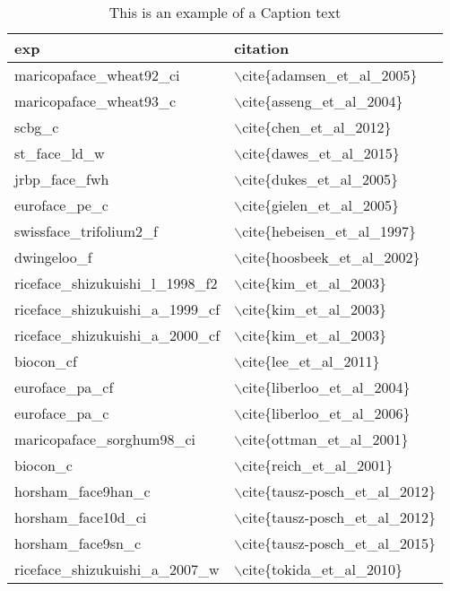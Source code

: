 \begin{table}[ht]
\centering
\begin{tabular}{ll}
  \hline
exp & citation \\ 
  \hline
maricopaface\_wheat92\_ci & $\backslash$cite\{adamsen\_et\_al\_2005\} \\ 
  maricopaface\_wheat93\_c & $\backslash$cite\{asseng\_et\_al\_2004\} \\ 
  scbg\_c & $\backslash$cite\{chen\_et\_al\_2012\} \\ 
  st\_face\_ld\_w & $\backslash$cite\{dawes\_et\_al\_2015\} \\ 
  jrbp\_face\_fwh & $\backslash$cite\{dukes\_et\_al\_2005\} \\ 
  euroface\_pe\_c & $\backslash$cite\{gielen\_et\_al\_2005\} \\ 
  swissface\_trifolium2\_f & $\backslash$cite\{hebeisen\_et\_al\_1997\} \\ 
  dwingeloo\_f & $\backslash$cite\{hoosbeek\_et\_al\_2002\} \\ 
  riceface\_shizukuishi\_l\_1998\_f2 & $\backslash$cite\{kim\_et\_al\_2003\} \\ 
  riceface\_shizukuishi\_a\_1999\_cf & $\backslash$cite\{kim\_et\_al\_2003\} \\ 
  riceface\_shizukuishi\_a\_2000\_cf & $\backslash$cite\{kim\_et\_al\_2003\} \\ 
  biocon\_cf & $\backslash$cite\{lee\_et\_al\_2011\} \\ 
  euroface\_pa\_cf & $\backslash$cite\{liberloo\_et\_al\_2004\} \\ 
  euroface\_pa\_c & $\backslash$cite\{liberloo\_et\_al\_2006\} \\ 
  maricopaface\_sorghum98\_ci & $\backslash$cite\{ottman\_et\_al\_2001\} \\ 
  biocon\_c & $\backslash$cite\{reich\_et\_al\_2001\} \\ 
  horsham\_face9han\_c & $\backslash$cite\{tausz-posch\_et\_al\_2012\} \\ 
  horsham\_face10d\_ci & $\backslash$cite\{tausz-posch\_et\_al\_2012\} \\ 
  horsham\_face9sn\_c & $\backslash$cite\{tausz-posch\_et\_al\_2015\} \\ 
  riceface\_shizukuishi\_a\_2007\_w & $\backslash$cite\{tokida\_et\_al\_2010\} \\ 
  \end{tabular}
\caption{This is an example of a Caption text} 
\end{table}
